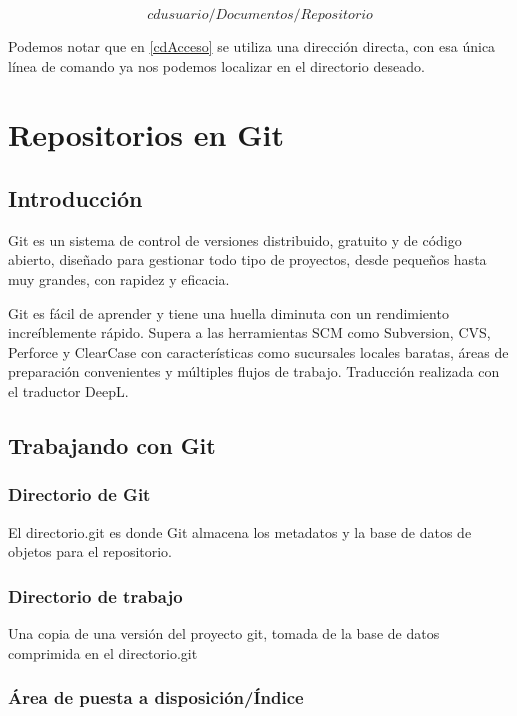 \documentclass[]{article}
\begin{document}
\begin{equation}
  cd usuario/Documentos/Repositorio
  \label{cdAcceso}
\end{equation}

Podemos notar que en \ref{cdAcceso} se utiliza una dirección directa, con esa única línea de comando ya nos podemos localizar en el directorio deseado.\\

\section{Repositorios en Git}

\subsection{Introducción}

 Git es un sistema de control de versiones distribuido, gratuito y de código abierto, diseñado para gestionar todo tipo de proyectos, desde pequeños hasta muy grandes, con rapidez y eficacia.
 
 Git es fácil de aprender y tiene una huella diminuta con un rendimiento increíblemente rápido. Supera a las herramientas SCM como Subversion, CVS, Perforce y ClearCase con características como sucursales locales baratas, áreas de preparación convenientes y múltiples flujos de trabajo.\cite{GitIntro} Traducción realizada con el traductor DeepL.\cite{DeepL}\\ 
 
 \subsection{Trabajando con Git}
 
 
 \subsubsection{Directorio de Git}
 
 El directorio.git es donde Git almacena los metadatos y la base de datos de objetos para el repositorio.
 
  \subsubsection{Directorio de trabajo}
 
 Una copia de una versión del proyecto git, tomada de la base de datos comprimida en el directorio.git 
 
  \subsubsection{Área de puesta a disposición/Índice}
  	
\end{document}
